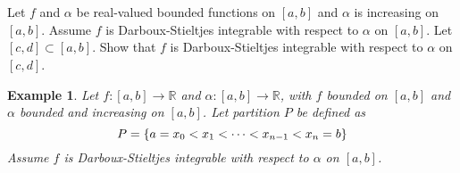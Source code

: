 \documentclass[]{article}
\newcommand{\R}{\mathbb{R}}
\newtheorem{example}{Example}
\begin{document}
\newpage
\section{}
Let $f$ and $\alpha$ be real-valued bounded functions on $[a,b]$ and $\alpha$ is increasing on $[a,b]$. 
Assume $f$ is Darboux-Stieltjes integrable with respect to $\alpha$ on $[a,b]$. 
Let $[c,d] \subset [a,b]$. 
Show that $f$ is Darboux-Stieltjes integrable with respect to $\alpha$ on $[c,d]$.

\begin{example}
    Let $f : [a,b] \to \R$ and $\alpha : [a,b] \to \R$, with $f$ bounded on $[a,b]$ and $\alpha$ bounded and increasing on $[a,b]$.
    Let partition $P$ be defined as \[
        P = \qty{a = x_0 < x_1 < \cdots < x_{n-1} < x_n = b}
    \] Assume $f$ is Darboux-Stieltjes integrable with respect to $\alpha$ on $[a,b]$. 
    

\end{example}
\end{document}

